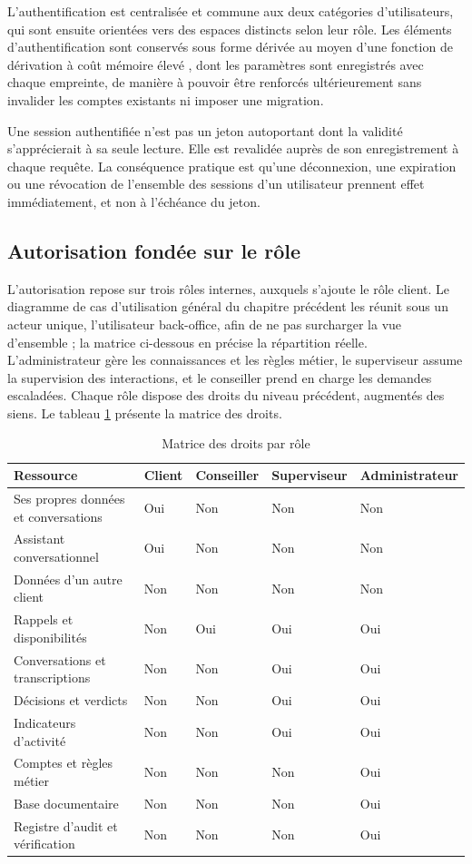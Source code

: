L'authentification est centralisée et commune aux deux catégories d'utilisateurs, qui sont ensuite orientées vers des espaces distincts selon leur rôle. Les éléments d'authentification sont conservés sous forme dérivée au moyen d'une fonction de dérivation à coût mémoire élevé \cite{scrypt}, dont les paramètres sont enregistrés avec chaque empreinte, de manière à pouvoir être renforcés ultérieurement sans invalider les comptes existants ni imposer une migration.

Une session authentifiée n'est pas un jeton autoportant dont la validité s'apprécierait à sa seule lecture. Elle est revalidée auprès de son enregistrement à chaque requête. La conséquence pratique est qu'une déconnexion, une expiration ou une révocation de l'ensemble des sessions d'un utilisateur prennent effet immédiatement, et non à l'échéance du jeton.

\subsection{Autorisation fondée sur le rôle}

L'autorisation repose sur trois rôles internes, auxquels s'ajoute le rôle client. Le diagramme de cas d'utilisation général du chapitre précédent les réunit sous un acteur unique, l'utilisateur back-office, afin de ne pas surcharger la vue d'ensemble ; la matrice ci-dessous en précise la répartition réelle. L'administrateur gère les connaissances et les règles métier, le superviseur assume la supervision des interactions, et le conseiller prend en charge les demandes escaladées. Chaque rôle dispose des droits du niveau précédent, augmentés des siens. Le tableau \ref{tab:rbac} présente la matrice des droits.

\begin{table}[H]
\centering
\renewcommand{\arraystretch}{1.2}
\begin{tabular}{|p{5.1cm}|p{1.9cm}|p{2.2cm}|p{2.2cm}|p{2.2cm}|}
\hline
\textbf{Ressource} & \textbf{Client} & \textbf{Conseiller} & \textbf{Super\-viseur} & \textbf{Admini\-strateur} \\
\hline
Ses propres données et conversations & Oui & Non & Non & Non \\
\hline
Assistant conversationnel & Oui & Non & Non & Non \\
\hline
Données d'un autre client & Non & Non & Non & Non \\
\hline
Rappels et disponibilités & Non & Oui & Oui & Oui \\
\hline
Conversations et transcriptions & Non & Non & Oui & Oui \\
\hline
Décisions et verdicts & Non & Non & Oui & Oui \\
\hline
Indicateurs d'activité & Non & Non & Oui & Oui \\
\hline
Comptes et règles métier & Non & Non & Non & Oui \\
\hline
Base documentaire & Non & Non & Non & Oui \\
\hline
Registre d'audit et vérification & Non & Non & Non & Oui \\
\hline
\end{tabular}
\caption{Matrice des droits par rôle}
\label{tab:rbac}
\end{table}

